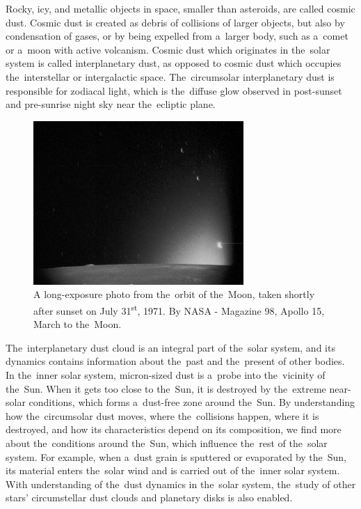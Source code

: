 
Rocky, icy, and metallic objects in space, smaller than asteroids, are called cosmic dust. Cosmic dust is created as debris of collisions of larger objects, but also by condensation of gases, or by being expelled from a~larger body, such as a~comet or a~moon with active volcanism. Cosmic dust which originates in the~solar system is called interplanetary dust, as opposed to cosmic dust which occupies the~interstellar or intergalactic space. The~circumsolar interplanetary dust is responsible for zodiacal light, which is the~diffuse glow observed in post-sunset and pre-sunrise night sky near the~ecliptic plane.

\begin{figure}[t]
 	\centering
 	\includegraphics[width=8cm]{figures/zodiacal_light.jpg}
 	\caption{A long-exposure photo from the~orbit of the~Moon, taken shortly after sunset on July 31\textsuperscript{st}, 1971. By NASA - Magazine 98, Apollo 15, March to the~Moon.}
 	\label{fig:zodiacal_light}
\end{figure}

The~interplanetary dust cloud is an integral part of the~solar system, and its dynamics contains information about the~past and the~present of other bodies. In the~inner solar system, micron-sized dust is a~probe into the~vicinity of the~Sun. When it gets too close to the~Sun, it is destroyed by the~extreme near-solar conditions, which forms a~dust-free zone around the~Sun. By understanding how the~circumsolar dust moves, where the~collisions happen, where it is destroyed, and how its characteristics depend on its composition, we find more about the~conditions around the~Sun, which influence the~rest of the~solar system. For example, when a~dust grain is sputtered or evaporated by the~Sun, its material enters the~solar wind and is carried out of the~inner solar system. With understanding of the~dust dynamics in the~solar system, the~study of other stars' circumstellar dust clouds and planetary disks is also enabled.

